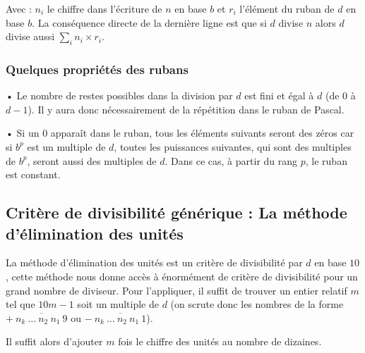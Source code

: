 \documentclass[a4paper]{article}
\begin{document}
\vspace{2 mm}

	Avec : $n_i$ le chiffre dans l'écriture de $n$ en base $b$ et $r_i$ l'élément du ruban de $d$ en base $b$.
La conséquence directe de la dernière ligne est que si $d$ divise $n$ alors $d$ divise aussi $\sum\limits_i n_i × r_i$.\\

\vfill



\subsubsection*{Quelques propriétés des rubans}\label{ruban_proprietes}

    • Le nombre de restes possibles dans la division par $d$ est fini et égal à $d$ (de $0$ à $d - 1$). Il y aura donc nécessairement de la répétition dans le ruban de Pascal.


    • Si un $0$ apparaît dans le ruban, tous les éléments suivants seront des zéros car si $b^p$ est un multiple de $d$, toutes les puissances suivantes, qui sont des multiples de $b^p$, seront aussi des multiples de $d$. Dans ce cas, à partir du rang $p$, le ruban est constant.\\

\vfill

\pagebreak















\subsection{Critère de divisibilité générique : La méthode d'élimination des unités}\label{recherche_critere}

	La méthode d'élimination des unités est un critère de divisibilité par $d$ en base $10$, cette méthode nous donne accès à énormément de critère de divisibilité pour un grand nombre de diviseur. Pour l'appliquer, il suffit de trouver un entier relatif $m$ tel que $10m - 1$ soit un multiple de $d$ (on scrute donc les nombres de la forme $+~\overline{n_{k}~\dots~n_{2}~n_{1}~9}$ ou $-~\overline{n_{k}~\dots~n_{2}~n_{1}~1}$).
	
	Il suffit alors d'ajouter $m$ fois le chiffre des unités au nombre de dizaines.\\
	
\end{document}
